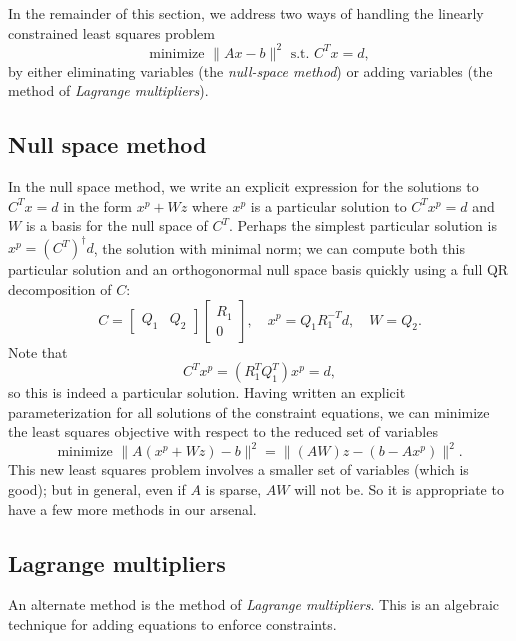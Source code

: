 \documentclass[12pt, leqno]{article} %
\begin{document}
In the remainder of this section, we address two ways of handling
the linearly constrained least squares problem
\[
  \mbox{minimize } \|Ax-b\|^2 \mbox{ s.t. } C^T x = d,
\]
by either eliminating variables (the {\em null-space method}) or adding
variables (the method of {\em Lagrange multipliers}).

\subsection{Null space method}

In the null space method, we write an explicit expression for the solutions
to $C^T x = d$ in the form $x^p + W z$ where $x^p$ is a particular solution
to $C^T x^p = d$ and $W$ is a basis for the null space of $C^T$.  Perhaps the
simplest particular solution is $x^p = (C^T)^\dagger d$, the solution with
minimal norm; we can compute both
this particular solution and an orthogonormal null space basis quickly
using a full QR decomposition of $C$:
\[
  C =
    \begin{bmatrix} Q_1 & Q_2 \end{bmatrix}
    \begin{bmatrix} R_1 \\ 0 \end{bmatrix}, \quad
  x^p = Q_1 R_1^{-T} d, \quad W = Q_2.
\]
Note that
\[
  C^T x^p = (R_1^T Q_1^T) x^p = d,
\]
so this is indeed a particular solution.
Having written an explicit parameterization for all solutions of the
constraint equations, we can minimize the least squares objective with
respect to the reduced set of variables
\[
  \mbox{minimize } \|A(x^p + Wz) - b\|^2 = \|(AW)z - (b-Ax^p)\|^2.
\]
This new least squares problem involves a smaller set of variables
(which is good); but in general, even if $A$ is sparse, $AW$ will not be.
So it is appropriate to have a few more methods in our arsenal.

\subsection{Lagrange multipliers}

An alternate method is the method of {\em Lagrange multipliers}.
This is an algebraic technique for adding equations to enforce constraints.
\end{document}
